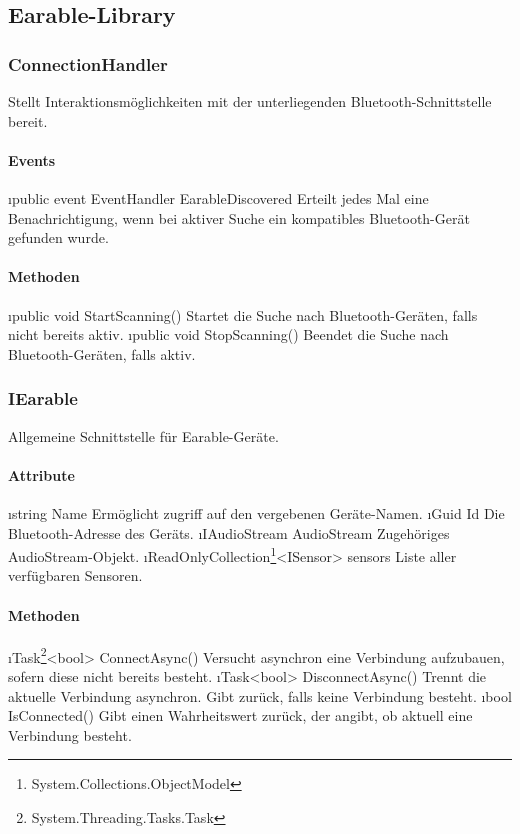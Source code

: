 \documentclass[../entwurf.tex]{subfiles}
\begin{document}
\subsection{Earable-Library}

\subsubsection{ConnectionHandler}
Stellt Interaktionsmöglichkeiten mit der unterliegenden Bluetooth-Schnittstelle bereit.
\paragraph{Events}
\begin{itemize}
	\i{public event EventHandler EarableDiscovered} Erteilt jedes Mal eine Benachrichtigung, wenn bei aktiver Suche ein kompatibles Bluetooth-Gerät gefunden wurde.
\end{itemize}
\paragraph{Methoden}
\begin{itemize}
	\i{public void StartScanning()} Startet die Suche nach Bluetooth-Geräten, falls nicht bereits aktiv.
	\i{public void StopScanning()} Beendet die Suche nach Bluetooth-Geräten, falls aktiv.
\end{itemize}

\subsubsection{IEarable}
Allgemeine Schnittstelle für Earable-Geräte.
\paragraph{Attribute}
\begin{itemize}
	\i{string Name} Ermöglicht zugriff auf den vergebenen Geräte-Namen.
	\i{Guid Id} Die Bluetooth-Adresse des Geräts.
	\i{IAudioStream AudioStream} Zugehöriges AudioStream-Objekt.
	\i{ReadOnlyCollection\footnote{System.Collections.ObjectModel}<ISensor> sensors} Liste aller verfügbaren Sensoren.
\end{itemize}
\paragraph{Methoden}
\begin{itemize}
	\i{Task\footnote{System.Threading.Tasks.Task}<bool> ConnectAsync()} Versucht asynchron eine Verbindung aufzubauen, sofern diese nicht bereits besteht.
	\i{Task<bool> DisconnectAsync()} Trennt die aktuelle Verbindung asynchron. Gibt  zurück, falls keine Verbindung besteht.
	\i{bool IsConnected()} Gibt einen Wahrheitswert zurück, der angibt, ob aktuell eine Verbindung besteht.
\end{itemize}
\end{document}
